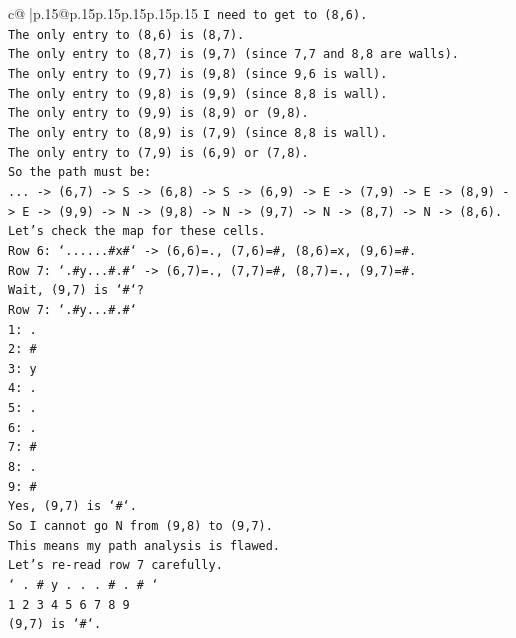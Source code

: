 \documentclass{article}
\begin{document}
{\begin{supertabular}{c@{$\;$}|p{.15\linewidth}@{}p{.15\linewidth}p{.15\linewidth}p{.15\linewidth}p{.15\linewidth}p{.15\linewidth}}
{{{\texttt{I need to get to (8,6).} \\
\texttt{The only entry to (8,6) is (8,7).} \\
\texttt{The only entry to (8,7) is (9,7) (since 7,7 and 8,8 are walls).} \\
\texttt{The only entry to (9,7) is (9,8) (since 9,6 is wall).} \\
\texttt{The only entry to (9,8) is (9,9) (since 8,8 is wall).} \\
\texttt{The only entry to (9,9) is (8,9) or (9,8).} \\
\texttt{The only entry to (8,9) is (7,9) (since 8,8 is wall).} \\
\texttt{The only entry to (7,9) is (6,9) or (7,8).} \\
\texttt{So the path must be:} \\
\texttt{... {-}> (6,7) {-}> S {-}> (6,8) {-}> S {-}> (6,9) {-}> E {-}> (7,9) {-}> E {-}> (8,9) {-}> E {-}> (9,9) {-}> N {-}> (9,8) {-}> N {-}> (9,7) {-}> N {-}> (8,7) {-}> N {-}> (8,6).} \\
\texttt{Let's check the map for these cells.} \\
\texttt{Row 6: `......\#x\#` {-}> (6,6)=., (7,6)=\#, (8,6)=x, (9,6)=\#.} \\
\texttt{Row 7: `.\#y...\#.\#` {-}> (6,7)=., (7,7)=\#, (8,7)=., (9,7)=\#.} \\
\texttt{Wait, (9,7) is `\#`?} \\
\texttt{Row 7: `.\#y...\#.\#`} \\
\texttt{1: .} \\
\texttt{2: \#} \\
\texttt{3: y} \\
\texttt{4: .} \\
\texttt{5: .} \\
\texttt{6: .} \\
\texttt{7: \#} \\
\texttt{8: .} \\
\texttt{9: \#} \\
\texttt{Yes, (9,7) is `\#`.} \\
\texttt{So I cannot go N from (9,8) to (9,7).} \\
\texttt{This means my path analysis is flawed.} \\
\texttt{Let's re{-}read row 7 carefully.} \\
\texttt{` . \# y . . . \# . \# `} \\
\texttt{1 2 3 4 5 6 7 8 9} \\
\texttt{(9,7) is `\#`.} \\
}}}
\end{supertabular}}
\end{document}
